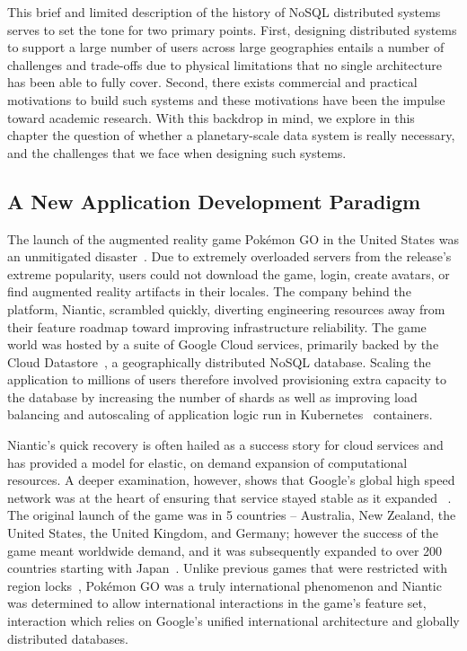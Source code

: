 This brief and limited description of the history of NoSQL distributed systems serves to set the tone for two primary points.
First, designing distributed systems to support a large number of users across large geographies entails a number of challenges and trade-offs due to physical limitations that no single architecture has been able to fully cover.
Second, there exists commercial and practical motivations to build such systems and these motivations have been the impulse toward academic research.
With this backdrop in mind, we explore in this chapter the question of whether a planetary-scale data system is really necessary, and the challenges that we face when designing such systems.

\subsection{A New Application Development Paradigm}


The launch of the augmented reality game Pokémon GO in the United States was an unmitigated disaster~\cite{kain_pokemon_2016}.
Due to extremely overloaded servers from the release's extreme popularity, users could not download the game, login, create avatars, or find augmented reality artifacts in their locales.
The company behind the platform, Niantic, scrambled quickly, diverting engineering resources away from their feature roadmap toward improving infrastructure reliability.
The game world was hosted by a suite of Google Cloud services, primarily backed by the Cloud Datastore~\cite{cloud_datastore}, a geographically distributed NoSQL database.
Scaling the application to millions of users therefore involved provisioning extra capacity to the database by increasing the number of shards as well as improving load balancing and autoscaling of application logic run in Kubernetes~\cite{Kubernetes} containers.

Niantic's quick recovery is often hailed as a success story for cloud services and has provided a model for elastic, on demand expansion of computational resources.
A deeper examination, however, shows that Google's global high speed network was at the heart of ensuring that service stayed stable as it expanded ~\cite{stone_bringing_2016}.
The original launch of the game was in 5 countries -- Australia, New Zealand, the United States, the United Kingdom, and Germany; however the success of the game meant worldwide demand, and it was subsequently expanded to over 200 countries starting with Japan~\cite{yamazaki_developer_2016}.
Unlike previous games that were restricted with region locks~\cite{region_locking}, Pokémon GO was a truly international phenomenon and Niantic was determined to allow international interactions in the game's feature set, interaction which relies on Google's unified international architecture and globally distributed databases.

